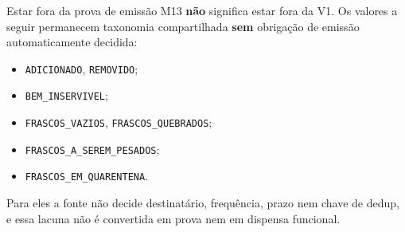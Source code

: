 Estar fora da prova de emissão M13 \textbf{não} significa estar fora da V1. Os
valores a seguir permanecem taxonomia compartilhada \textbf{sem} obrigação de
emissão automaticamente decidida:
\begin{itemize}
  \item \texttt{ADICIONADO}, \texttt{REMOVIDO};
  \item \texttt{BEM\_INSERVIVEL};
  \item \texttt{FRASCOS\_VAZIOS}, \texttt{FRASCOS\_QUEBRADOS};
  \item \texttt{FRASCOS\_A\_SEREM\_PESADOS};
  \item \texttt{FRASCOS\_EM\_QUARENTENA}.
\end{itemize}
Para eles a fonte não decide destinatário, frequência, prazo nem chave de dedup,
e essa lacuna não é convertida em prova nem em dispensa funcional.

